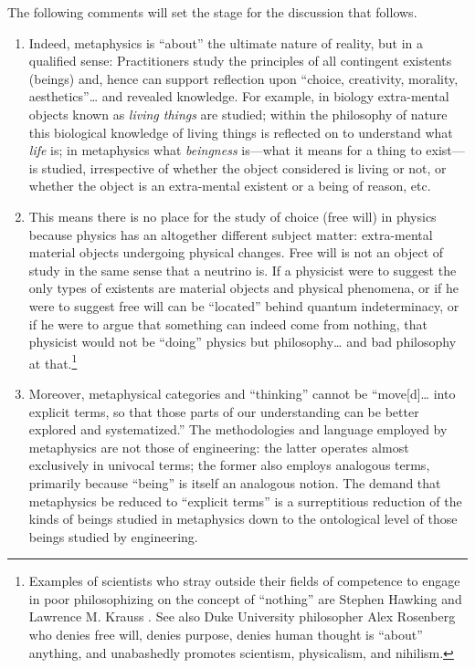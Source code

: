 The following comments will set the stage for the discussion that follows.

\begin{enumerate}
\item Indeed, metaphysics is ``about'' the ultimate nature of reality, but in a qualified sense: Practitioners study the principles of all contingent existents (beings) and, hence can support reflection upon ``choice, creativity, morality, aesthetics''\ldots{} and revealed knowledge. For example, in biology extra-mental objects known as \textit{living things} are studied; within the philosophy of nature this biological knowledge of living things is reflected on to understand what \textit{life} is; in metaphysics what \textit{beingness} is---what it means for a thing to exist---is studied, irrespective of whether the object considered is living or not, or whether the object is an extra-mental existent or a being of reason, etc.
\item This means there is no place for the study of choice (free will) in physics because physics has an altogether different subject matter: extra-mental material objects undergoing physical changes. Free will is not an object of study in the same sense that a neutrino is. If a physicist were to suggest the only types of existents are material objects and physical phenomena, or if he were to suggest free will can be ``located'' behind quantum indeterminacy, or if he were to argue that something can indeed come from nothing, that physicist would not be ``doing'' physics but philosophy\ldots{} and bad philosophy at that.\footnote{Examples 
of scientists who stray outside their fields of competence to engage in poor philosophizing on the concept of “nothing” are Stephen Hawking \citeyearpar{hawking2012} and Lawrence M. Krauss \citeyearpar{krauss2013}. 
See also Duke University philosopher Alex Rosenberg \citeyearpar{rosenberg2013} who denies free will, denies purpose, denies human thought is “about” anything, and unabashedly promotes scientism, physicalism, and nihilism.}
\item Moreover, metaphysical categories and ``thinking'' cannot be ``move[d]… into explicit terms, so that those parts of our understanding can be better explored and systematized.'' The methodologies and language employed by metaphysics are not those of engineering: the latter operates almost exclusively in univocal terms; the former also employs analogous terms, primarily because ``being'' is itself an analogous notion. The demand that metaphysics be reduced to ``explicit terms'' is a surreptitious reduction of the kinds of beings studied in metaphysics down to the ontological level of those beings studied by engineering.

\end{enumerate}
